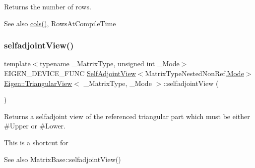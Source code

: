 \begin{DoxyReturn}{Returns}
the number of rows. 
\end{DoxyReturn}
\begin{DoxySeeAlso}{See also}
\mbox{\hyperlink{class_eigen_1_1_triangular_view_ae0a22563fd472eca7aaf9bc5f29d2898}{cols()}}, Rows\+At\+Compile\+Time 
\end{DoxySeeAlso}
\mbox{\label{class_eigen_1_1_triangular_view_a1fe2e5e93164b2efb5124297b096fb10}} 
\subsubsection{\texorpdfstring{selfadjointView()}{selfadjointView()}\hspace{0.1cm}{\footnotesize\ttfamily [1/2]}}
{\footnotesize\ttfamily template$<$typename \+\_\+\+Matrix\+Type, unsigned int \+\_\+\+Mode$>$ \\
E\+I\+G\+E\+N\+\_\+\+D\+E\+V\+I\+C\+E\+\_\+\+F\+U\+NC \mbox{\hyperlink{class_eigen_1_1_self_adjoint_view}{Self\+Adjoint\+View}}$<$Matrix\+Type\+Nested\+Non\+Ref,\mbox{\hyperlink{struct_mode}{Mode}}$>$ \mbox{\hyperlink{class_eigen_1_1_triangular_view}{Eigen\+::\+Triangular\+View}}$<$ \+\_\+\+Matrix\+Type, \+\_\+\+Mode $>$\+::selfadjoint\+View (\begin{DoxyParamCaption}{ }\end{DoxyParamCaption})\hspace{0.3cm}{\ttfamily [inline]}}

\begin{DoxyReturn}{Returns}
a selfadjoint view of the referenced triangular part which must be either {\ttfamily \#\+Upper} or {\ttfamily \#\+Lower}.
\end{DoxyReturn}
This is a shortcut for
\begin{DoxyCode}{0}
\end{DoxyCode}
 \begin{DoxySeeAlso}{See also}
Matrix\+Base\+::selfadjoint\+View() 
\end{DoxySeeAlso}
\mbox{\label{class_eigen_1_1_triangular_view_ade4c489f8fb9f5e31d3c3a64e19c166a}} 

